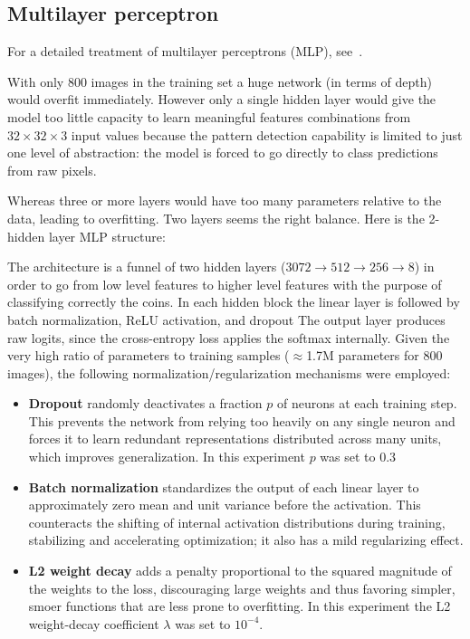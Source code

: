 \documentclass[11pt,a4paper]{article}
\begin{document}
\subsection{Multilayer perceptron}
For a detailed treatment of multilayer perceptrons (MLP), see~\cite{pml1Book}.

With only 800 images in the training set a huge network (in terms of depth) would overfit immediately.
However only a single hidden layer would give the model too little capacity to learn meaningful features combinations from $32 \times 32 \times 3$ input values because the pattern detection capability is limited to just one level of abstraction: the model is forced to go directly to class predictions from raw pixels.

Whereas three or more layers would have too many parameters relative to the data, leading to overfitting.
Two layers seems the right balance. Here is the 2-hidden layer MLP structure:

The architecture is a funnel of two hidden layers
($3072 \to 512 \to 256 \to 8$) in order to go from low level features to higher level features with the purpose of classifying correctly the coins. In each hidden block the linear layer is followed by batch normalization, ReLU activation,
and dropout  The output layer produces raw logits, since the cross-entropy
loss applies the softmax internally. Given the very high ratio of parameters to
training samples ($\approx$1.7M parameters for 800 images), the following normalization/regularization mechanisms were employed: 
\begin{itemize}
  \item \textbf{Dropout} randomly deactivates a fraction $p$ of neurons at each
  training step. This prevents the network from relying too heavily on any single
  neuron and forces it to learn redundant representations distributed across many
  units, which improves generalization. In this experiment $p$ was set to $0.3$
  \item \textbf{Batch normalization} standardizes the output of each linear layer to
  approximately zero mean and unit variance before the activation. This counteracts the
  shifting of internal activation distributions during training, stabilizing and
  accelerating optimization; it also has a mild regularizing effect.
 \item \textbf{L2 weight decay} adds a penalty proportional to the squared magnitude of
the weights to the loss, discouraging large weights and thus favoring simpler,
smoer functions that are less prone to overfitting. In this experiment the 
L2 weight-decay coefficient $\lambda$ was set to $10^{-4}$.
\end{itemize}
\end{document}
